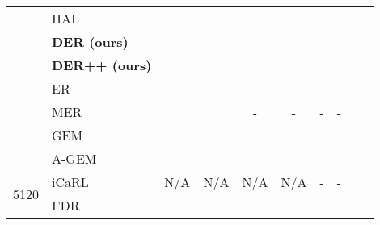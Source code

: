 \documentclass{article}
\begin{document}
\begin{table}[H]
{{\begin{tabular}{clcccccccc}
                        & HAL                   & \tiny{}                           & \tiny{}                            &  \tiny{}                          & \tiny{}                            & \tiny{}                           & \tiny{} \\
                        & \textbf{DER (ours)}   &  \tiny{}&  \tiny{} & \tiny{}                          & \tiny{}                           &  \tiny{}                           & \tiny{} \\
                        & \textbf{DER++ (ours)} & \tiny{}                          & \tiny{}                           &  \tiny{}                          & \tiny{}                           & \tiny{}                           & \tiny{} \\
\midrule                            
                        & ER                    & \tiny{}                          &  \tiny{}                           & \tiny{}                          & \tiny{}                           &  \tiny{} & \tiny{} \\
                        & MER                   & \tiny{}                          & \tiny{}                           & -                                                 & -                                                 & -                                                 & -                       \\
                        & GEM                   &  \tiny{}                          & \tiny{}                           & \tiny{}                           & \tiny{}                           &  \tiny{}                           & \tiny{} \\
                        & A-GEM                 & \tiny{}                          &  \tiny{} & \tiny{}                           & \tiny{}                           &  \tiny{}                           & \tiny{} \\              
\multirow{2}{*}{5120}   & iCaRL                 & N/A                                               & N/A                                               & N/A                                               & N/A                                               & -                                                 & -                       \\
                        & FDR                   &  \tiny{}& \tiny{}                           & \tiny{}                           & \tiny{}                           & \tiny{}                           & \tiny{} \\

\end{tabular}}}
\end{table}
\end{document}
